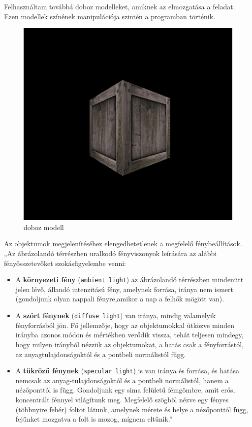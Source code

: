 Felhasználtam továbbá doboz modelleket, amiknek az elmozgatása a feladat. Ezen modellek színének manipulációja szintén a programban történik.
\begin{figure}[htp]
    \centering
   	\includegraphics[width=4truecm, height=3truecm]{images/box.png}
	\caption{doboz modell}
\end{figure}


Az objektumok megjelenítéséhez elengedhetetlenek a megfelelő fénybeállítások.\\

„Az ábrázolandó térrészben uralkodó fényviszonyok leírására az alábbi fényösszetevőket szokásfigyelembe venni:

\begin{itemize}
\item A {\bf környezeti fény} (\texttt{ambient light}) az ábrázolandó térrészben mindenütt jelen lévő, állandó intenzitású fény, amelynek forrása, iránya nem ismert (gondoljunk olyan nappali fényre,amikor a nap a felhők mögött van).
\item A {\bf szórt fénynek} (\texttt{diffuse light}) van iránya, mindig valamelyik fényforrásból jön. Fő jellemzője, hogy az objektumokkal ütközve minden irányba azonos módon és mértékben verődik vissza, tehát teljesen mindegy, hogy milyen irányból nézzük az objektumokat, a hatás csak a fényforrástól, az anyagtulajdonságoktól és a pontbeli normálistól függ.
\item A {\bf tükröző fénynek} (\texttt{specular light}) is van iránya és forrása, és hatása nemcsak az anyag-tulajdonságoktól és a pontbeli normálistól, hanem a nézőponttól is függ. Gondoljunk egy sima felületű fémgömbre, amit erős, koncentrált fénnyel világítunk meg. Megfelelő szögből nézve egy fényes (többnyire fehér) foltot látunk, amelynek mérete és helye a nézőponttól függ, fejünket mozgatva a folt is mozog, mígnem eltűnik.”\cite{fenyek_szinek}
\end{itemize}

